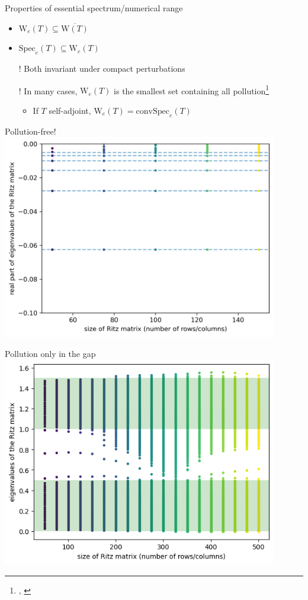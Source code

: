 \documentclass[14pt]{beamer}
\newcommand{\Spec}{\mathrm{Spec}} %
\newcommand{\Num}{\mathrm{W}} %
\newcommand{\1}{\mathbf{1}}
\begin{document}
\begin{frame}{Properties of essential spectrum/numerical range}
  \begin{itemize}
    \item $\Num_e(T) \subseteq \overline{\Num(T)}$
    \item $\Spec_e(T) \subseteq \Num_e(T)$
    \item[!] Both invariant under compact perturbations
    \item[!] In many cases, $\Num_e(T)$ is the smallest set containing all pollution\footnote{\textcite{pokrzywa1979method}, \textcite{bogli2020essential}}
      \begin{itemize}
        \item If $T$ self-adjoint, $\Num_e(T) = \mathrm{conv}\Spec_e(T)$
      \end{itemize}
  \end{itemize}
\end{frame}

\begin{frame}{Pollution-free!}
  \includegraphics[width=0.9\textwidth]{hydrogen}
\end{frame}

\begin{frame}{Pollution only in the gap}
  \includegraphics[width=0.9\textwidth]{mult-op-spec}
\end{frame}
\end{document}
